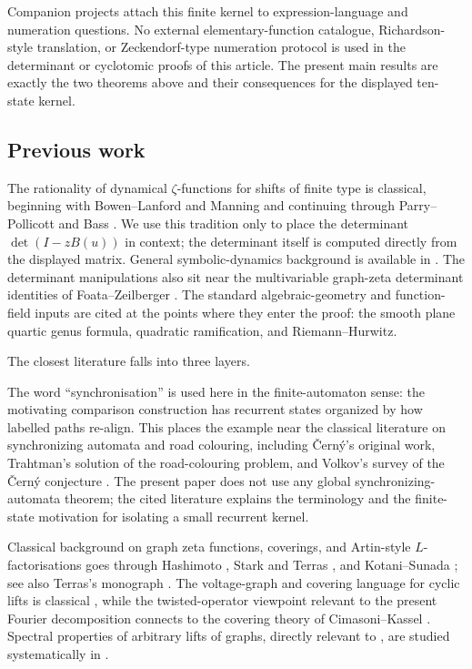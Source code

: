 \begin{remark}
  \label{rem:expression-interface-boundary}
  Companion projects attach this finite kernel to expression-language
  and numeration questions.  No external elementary-function catalogue,
  Richardson-style translation, or Zeckendorf-type numeration protocol is
  used in the determinant or cyclotomic proofs of this article.  The
  present main results are exactly the two theorems above and their
  consequences for the displayed ten-state kernel.
\end{remark}

\subsection{Previous work}


The rationality of dynamical \(\zeta\)-functions for shifts of finite
type is classical, beginning with Bowen--Lanford and Manning and
continuing through Parry--Pollicott and Bass
\cite{BowenLanford1970Zeta,Manning1971Axiom,ParryPollicott1983,Bass1992}.
We use this tradition only to place the determinant
\(\det(I-zB(u))\) in context; the determinant itself is computed
directly from the displayed matrix. General symbolic-dynamics
background is available in \cite{ArtinMazur1965,Ruelle1976,
LindMarcus2021,Kitchens1998}. The determinant manipulations also sit
near the multivariable graph-zeta determinant identities of
Foata--Zeilberger \cite{FoataZeilberger1999}. The standard
algebraic-geometry and function-field inputs are cited at the points
where they enter the proof: the smooth plane quartic genus formula,
quadratic ramification, and Riemann--Hurwitz.

The closest literature falls into three layers.

The word ``synchronisation'' is used here in the finite-automaton sense:
the motivating comparison construction has recurrent states organized by
how labelled paths re-align.  This places the example near the classical
literature on synchronizing automata and road colouring, including
\v{C}ern\'y's original work, Trahtman's solution of the road-colouring
problem, and Volkov's survey of the \v{C}ern\'y conjecture
\cite{Cerny1964,Trahtman2009,Volkov2008}.  The present paper does not
use any global synchronizing-automata theorem; the cited literature
explains the terminology and the finite-state motivation for isolating a
small recurrent kernel.

Classical background on graph zeta functions, coverings, and
Artin-style \(L\)-factorisations goes through Hashimoto
\cite{Hashimoto1990,Hashimoto1992}, Stark and Terras
\cite{StarkTerras1996,StarkTerras2000,StarkTerras2007}, and
Kotani--Sunada \cite{KotaniSunada2000}; see also Terras's monograph
\cite{Terras2011}. The voltage-graph and covering language for cyclic
lifts is classical \cite{GrossTucker2001}, while the twisted-operator
viewpoint relevant to the present Fourier decomposition connects to the
covering theory of Cimasoni--Kassel \cite{CimasoniKassel2023}. Spectral
properties of arbitrary lifts of graphs, directly relevant to
, are studied systematically
in \cite{DalfoFiolGarriga2019}.

